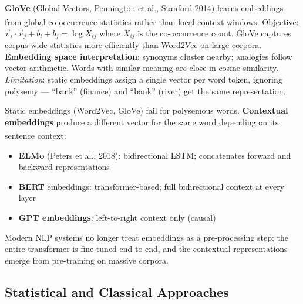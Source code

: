 \begin{tcbitemize}[ skin=sectionraster ]
    \tcbitem[title={GloVe and the Embedding Geometry}, raster multicolumn=3]
    \textbf{GloVe} (Global Vectors, Pennington et al., Stanford 2014) learns embeddings from global co-occurrence statistics rather than local context windows\textsuperscript{\cite[][p.~35]{farrisHowLargeLanguage2025}}.
    Objective: $\vec{v}_i \cdot \vec{v}_j + b_i + b_j = \log X_{ij}$ where $X_{ij}$ is the co-occurrence count.
    GloVe captures corpus-wide statistics more efficiently than Word2Vec on large corpora.
    \tcblower
    \textbf{Embedding space interpretation}: synonyms cluster nearby; analogies follow vector arithmetic.
    Words with similar meaning are close in cosine similarity.
    \emph{Limitation}: static embeddings assign a single vector per word token, ignoring polysemy --- ``bank'' (finance) and ``bank'' (river) get the same representation.

    \tcbitem[title={Contextual Embeddings}, raster multicolumn=3]
    Static embeddings (Word2Vec, GloVe) fail for polysemous words.
    \textbf{Contextual embeddings} produce a different vector for the same word depending on its sentence context\textsuperscript{\cite[][p.~35]{farrisHowLargeLanguage2025}}:
    \begin{itemize}
        \item \textbf{ELMo} (Peters et al., 2018): bidirectional LSTM; concatenates forward and backward representations
        \item \textbf{BERT} embeddings: transformer-based; full bidirectional context at every layer
        \item \textbf{GPT embeddings}: left-to-right context only (causal)
    \end{itemize}
    Modern NLP systems no longer treat embeddings as a pre-processing step; the entire transformer is fine-tuned end-to-end, and the contextual representations emerge from pre-training on massive corpora.
\end{tcbitemize}

\subsection{Statistical and Classical Approaches}

